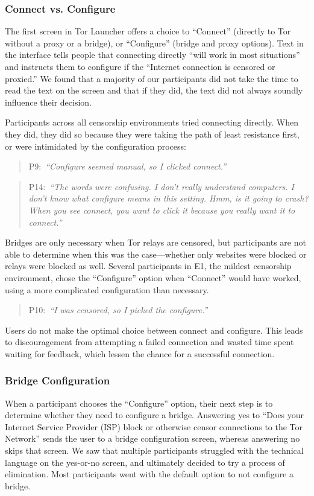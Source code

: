 \documentclass[USenglish,oneside,twocolumn]{article}
\newcommand{\pquote}[2]{
\begin{quotation}
\noindent #1:~\textit{``#2''}
\end{quotation}
}
\begin{document}
\subsubsection{Connect vs. Configure} 
The first screen in Tor Launcher offers a choice to
``Connect'' (directly to Tor without a proxy or a bridge),
or ``Configure'' (bridge and proxy options).
Text in the interface tells people that connecting directly ``will work in most situations'' and instructs them to configure if the ``Internet connection is censored or proxied.'' We found that a majority of our participants did not take the time to read the text on the screen and that if they did, the text did not always soundly influence their decision.

Participants across all censorship environments tried connecting directly. When they did, they did so because they were taking the path of least resistance first, or were intimidated by the configuration process:
\pquote{P9}{Configure seemed manual, so I clicked connect.}
\pquote{P14}{The words were confusing. I don't really understand computers. I don't know what configure means in this setting. Hmm, is it going to crash? When you see connect, you want to click it because you really want it to connect.}

Bridges are only necessary when Tor relays are censored, but participants are not able to determine when this was the case---whether only websites were blocked or relays were blocked as well. Several participants in E1, the mildest censorship environment, chose the ``Configure'' option when ``Connect'' would have worked, using a more complicated configuration than necessary.

\pquote{P10}{I was censored, so I picked the configure.}

Users do not make the optimal choice between connect and configure. This leads to discouragement from attempting a failed connection and wasted time spent waiting for feedback, which lessen the chance for a successful connection. 

\subsubsection{Bridge Configuration} 
When a participant chooses the ``Configure'' option, their next step is to determine whether they need to configure a bridge. Answering yes to ``Does your Internet Service Provider (ISP) block or otherwise censor connections to the Tor Network'' sends the user to a bridge configuration screen, whereas answering no skips that screen. We saw that multiple participants struggled with the technical language on the yes-or-no screen, and ultimately decided to try a process of elimination. Most participants went with the default option to not configure a bridge. 
\end{document}

